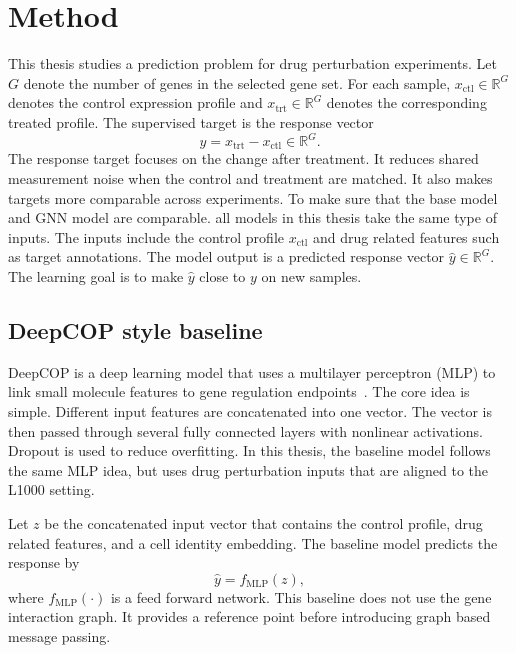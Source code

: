 \chapter{Method}

This thesis studies a prediction problem for drug perturbation experiments. Let $G$ denote the number of genes in the selected gene set. For each sample, $x_{\mathrm{ctl}} \in \mathbb{R}^{G}$ denotes the control expression profile and $x_{\mathrm{trt}} \in \mathbb{R}^{G}$ denotes the corresponding treated profile. The supervised target is the response vector
\begin{equation}
y = x_{\mathrm{trt}} - x_{\mathrm{ctl}} \in \mathbb{R}^{G}.
\end{equation}
The response target focuses on the change after treatment. It reduces shared measurement noise when the control and treatment are matched. It also makes targets more comparable across experiments. To make sure that the base model and GNN model are comparable. all models in this thesis take the same type of inputs. The inputs include the control profile $x_{\mathrm{ctl}}$ and drug related features such as target annotations. The model output is a predicted response vector $\hat{y} \in \mathbb{R}^{G}$. The learning goal is to make $\hat{y}$ close to $y$ on new samples.

\section{DeepCOP style baseline}
\noindent DeepCOP is a deep learning model that uses a multilayer perceptron (MLP) to link small molecule features to gene regulation endpoints~\cite{woo2020deepcop}. The core idea is simple. Different input features are concatenated into one vector. The vector is then passed through several fully connected layers with nonlinear activations. Dropout is used to reduce overfitting. In this thesis, the baseline model follows the same MLP idea, but uses drug perturbation inputs that are aligned to the L1000 setting.

\noindent Let $z$ be the concatenated input vector that contains the control profile, drug related features, and a cell identity embedding. The baseline model predicts the response by
\begin{equation}
\hat{y}=f_{\mathrm{MLP}}(z),
\end{equation}
where $f_{\mathrm{MLP}}(\cdot)$ is a feed forward network. This baseline does not use the gene interaction graph. It provides a reference point before introducing graph based message passing.

